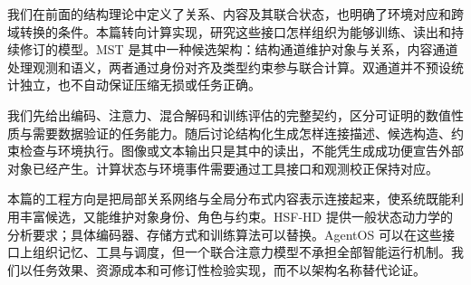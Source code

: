 \label{part:engineering}

我们在前面的结构理论中定义了关系、内容及其联合状态，也明确了环境对应和跨域转换的条件。本篇转向计算实现，研究这些接口怎样组织为能够训练、读出和持续修订的模型。MST 是其中一种候选架构：结构通道维护对象与关系，内容通道处理观测和语义，两者通过身份对齐及类型约束参与联合计算。双通道并不预设统计独立，也不自动保证压缩无损或任务正确。

我们先给出编码、注意力、混合解码和训练评估的完整契约，区分可证明的数值性质与需要数据验证的任务能力。随后讨论结构化生成怎样连接描述、候选构造、约束检查与环境执行。图像或文本输出只是其中的读出，不能凭生成成功便宣告外部对象已经产生。计算状态与环境事件需要通过工具接口和观测校正保持对应。

本篇的工程方向是把局部关系网络与全局分布式内容表示连接起来，使系统既能利用丰富候选，又能维护对象身份、角色与约束。HSF-HD 提供一般状态动力学的分析要求；具体编码器、存储方式和训练算法可以替换。AgentOS 可以在这些接口上组织记忆、工具与调度，但一个联合注意力模型不承担全部智能运行机制。我们以任务效果、资源成本和可修订性检验实现，而不以架构名称替代论证。
